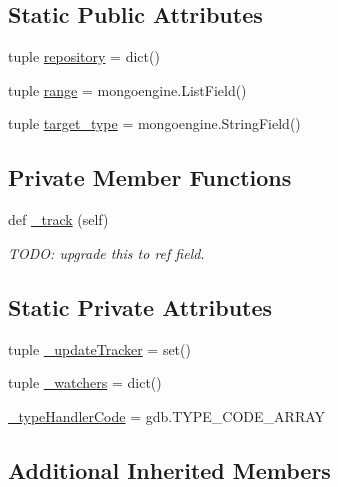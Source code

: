 \subsection*{Static Public Attributes}
\begin{DoxyCompactItemize}
\item 
tuple \hyperlink{classmemoryoracle_1_1instance_1_1Array_ae8a854bbb76db4aa9661677964d99846}{repository} = dict()
\item 
tuple \hyperlink{classmemoryoracle_1_1instance_1_1Array_acb456ee173f41d41e16e1bebfba48aa6}{range} = mongoengine.\+List\+Field()
\item 
tuple \hyperlink{classmemoryoracle_1_1instance_1_1Array_a23836ff62d41326159a9a47ad3813e38}{target\+\_\+type} = mongoengine.\+String\+Field()
\end{DoxyCompactItemize}
\subsection*{Private Member Functions}
\begin{DoxyCompactItemize}
\item 
def \hyperlink{classmemoryoracle_1_1instance_1_1Array_a1d8c3993d8a52bfbec8240d6f79b3ce1}{\+\_\+track} (self)
\begin{DoxyCompactList}\small\item\em T\+O\+D\+O\+: upgrade this to ref field. \end{DoxyCompactList}\end{DoxyCompactItemize}
\subsection*{Static Private Attributes}
\begin{DoxyCompactItemize}
\item 
tuple \hyperlink{classmemoryoracle_1_1instance_1_1Array_acbb6dbe2e7651d120b69fb39ad808b69}{\+\_\+update\+Tracker} = set()
\item 
tuple \hyperlink{classmemoryoracle_1_1instance_1_1Array_a339afab4d326c225b0a95ee0cabcc19a}{\+\_\+watchers} = dict()
\item 
\hyperlink{classmemoryoracle_1_1instance_1_1Array_a768da780abb79bd63ffc4e47f920de51}{\+\_\+type\+Handler\+Code} = gdb.\+T\+Y\+P\+E\+\_\+\+C\+O\+D\+E\+\_\+\+A\+R\+R\+A\+Y
\end{DoxyCompactItemize}
\subsection*{Additional Inherited Members}


